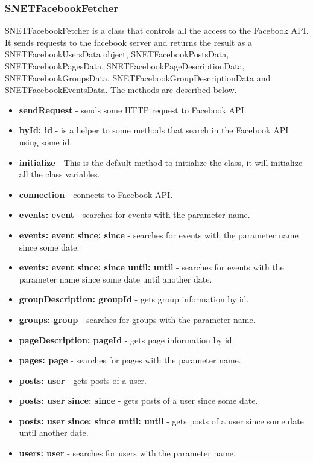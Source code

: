 \subsubsection{SNETFacebookFetcher}
\label{sec-1-4-2}
SNETFacebookFetcher is a class that controls all the access to the Facebook API.
It sends requests to the facebook server and returns the result as a SNETFacebookUsersData object, SNETFacebookPostsData, SNETFacebookPagesData, SNETFacebookPageDescriptionData, SNETFacebookGroupsData, SNETFacebookGroupDescriptionData and SNETFacebookEventsData.
The methods are described below.
\begin{itemize}
\item \textbf{sendRequest} - sends some HTTP request to Facebook API.
\item \textbf{byId: id} - is a helper to some methods that search in the Facebook API using some id.
\item \textbf{initialize} - This is the default method to initialize the class, it will initialize all the class variables.
\item \textbf{connection} - connects to Facebook API.
\item \textbf{events: event} - searches for events with the parameter name.
\item \textbf{events: event since: since} - searches for events with the parameter name since some date.
\item \textbf{events: event since: since until: until} - searches for events with the parameter name since some date until another date.
\item \textbf{groupDescription: groupId} - gets group information by id.
\item \textbf{groups: group} - searches for groups with the parameter name.
\item \textbf{pageDescription: pageId} - gets page information by id.
\item \textbf{pages: page} - searches for pages with the parameter name.
\item \textbf{posts: user} - gets posts of a user.
\item \textbf{posts: user since: since} - gets posts of a user since some date.
\item \textbf{posts: user since: since until: until} - gets posts of a user since some date until another date.
\item \textbf{users: user} - searches for users with the parameter name.
\end{itemize}

